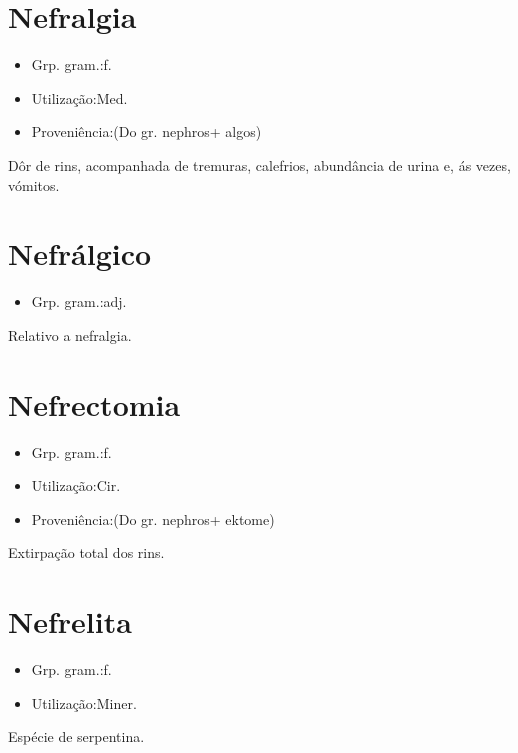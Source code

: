 \section{Nefralgia}
\begin{itemize}
\item {Grp. gram.:f.}
\end{itemize}
\begin{itemize}
\item {Utilização:Med.}
\end{itemize}
\begin{itemize}
\item {Proveniência:(Do gr. \textunderscore nephros\textunderscore  + \textunderscore algos\textunderscore )}
\end{itemize}
Dôr de rins, acompanhada de tremuras, calefrios, abundância de urina e, ás vezes, vómitos.
\section{Nefrálgico}
\begin{itemize}
\item {Grp. gram.:adj.}
\end{itemize}
Relativo a nefralgia.
\section{Nefrectomia}
\begin{itemize}
\item {Grp. gram.:f.}
\end{itemize}
\begin{itemize}
\item {Utilização:Cir.}
\end{itemize}
\begin{itemize}
\item {Proveniência:(Do gr. \textunderscore nephros\textunderscore  + \textunderscore ektome\textunderscore )}
\end{itemize}
Extirpação total dos rins.
\section{Nefrelita}
\begin{itemize}
\item {Grp. gram.:f.}
\end{itemize}
\begin{itemize}
\item {Utilização:Miner.}
\end{itemize}
Espécie de serpentina.
